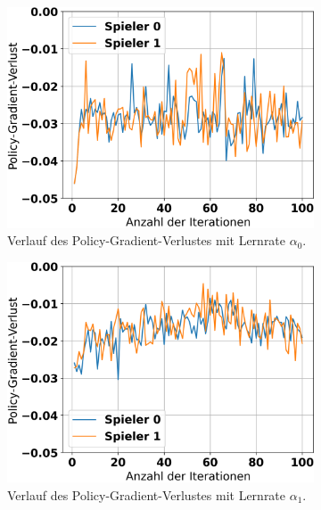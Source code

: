 \begin{figure}[ht!]%
	\begin{subfigure}[b]{0.32\textwidth}
		\includegraphics[width=\textwidth]{Bilder/ensemble-training/a_0_001/graph_policy_gradient_losses.png}
		\caption{Verlauf des Policy-Gradient-Verlustes mit Lernrate $\alpha_0$.}
		\label{fig:f16}
	\end{subfigure}
	\hfill
	\begin{subfigure}[b]{0.32\textwidth}
		\includegraphics[width=\textwidth]{Bilder/ensemble-training/b_0_0003/graph_policy_gradient_losses.png}
		\caption{Verlauf des Policy-Gradient-Verlustes mit Lernrate $\alpha_1$.}
		\label{fig:f17}
	\end{subfigure}
	\hfill
	\begin{subfigure}[b]{0.32\textwidth}

\end{subfigure}
\end{figure}
